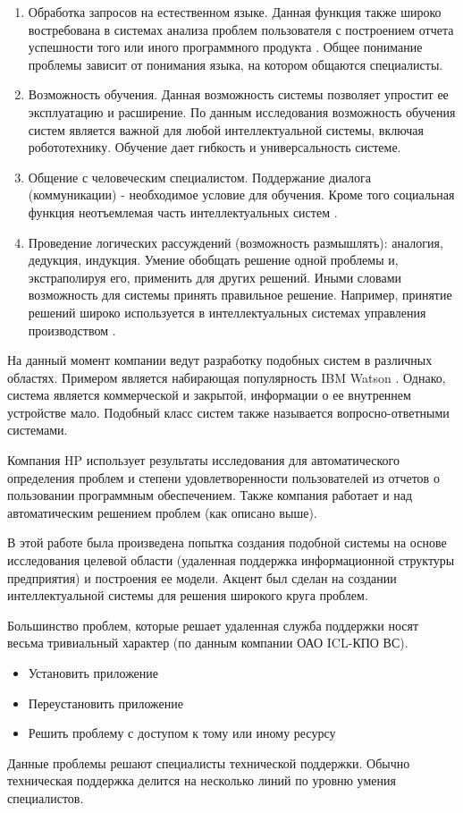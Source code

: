 \begin{enumerate}
  \item Обработка запросов на естественном языке. Данная функция также широко востребована в системах анализа проблем пользователя с построением отчета успешности того или иного программного продукта \cite{TUTUB-1}. Общее понимание проблемы зависит от понимания языка, на котором общаются специалисты.
  \item Возможность обучения. Данная возможность системы позволяет упростит ее эксплуатацию и расширение. По данным исследования \cite{LEARN-1} возможность обучения систем является важной для любой интеллектуальной системы, включая робототехнику. Обучение дает гибкость и универсальность системе.
  \item Общение с человеческим специалистом. Поддержание диалога (коммуникации) - необходимое условие для обучения. Кроме того социальная функция неотъемлемая часть интеллектуальных систем \cite{LEARN-2}.
  \item Проведение логических рассуждений (возможность размышлять): аналогия, дедукция, индукция. Умение обобщать решение одной проблемы и, экстраполируя его, применить для других решений. Иными словами возможность для системы принять правильное решение. Например, принятие решений широко используется в интеллектуальных системах управления производством \cite{LEARN-3}.
\end{enumerate}

На данный момент компании ведут разработку подобных систем в различных областях. Примером является набирающая популярность IBM Watson \cite{WATSON-PO} \cite{WATSON-PTOP}. Однако, система является коммерческой и закрытой, информации о ее внутреннем устройстве мало. Подобный класс систем также называется вопросно-ответными системами. \par
Компания HP использует результаты исследования \cite{TUTUB-2} для автоматического определения проблем и степени удовлетворенности пользователей из отчетов о пользовании программным обеспечением. Также компания работает и над автоматическим решением проблем (как описано выше). \par
В этой работе была произведена попытка создания подобной системы на основе исследования целевой области (удаленная поддержка информационной структуры предприятия) и построения ее модели.
 Акцент был сделан на создании интеллектуальной системы для решения широкого круга проблем. \par
Большинство проблем, которые решает удаленная служба поддержки носят весьма тривиальный характер (по данным компании ОАО ICL-КПО ВС).
\begin{itemize}
	\item Установить приложение
	\item Переустановить приложение
	\item Решить проблему с доступом к тому или иному ресурсу
\end{itemize}
Данные проблемы решают специалисты технической поддержки. Обычно техническая поддержка делится на несколько линий по уровню умения специалистов.

